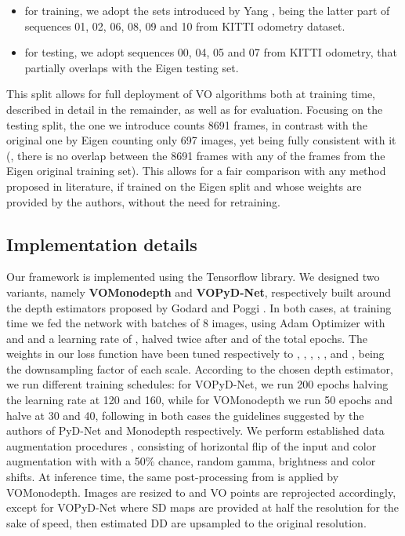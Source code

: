 \documentclass[10pt,twocolumn,letterpaper]{article}
\begin{document}
\begin{itemize}
    \item for training, we adopt the  sets introduced by Yang \etal \cite{yang2018deep}, being the latter part of sequences 01, 02, 06, 08, 09 and 10 from KITTI odometry dataset.
    
    \item for testing, we adopt sequences 00, 04, 05 and 07 from KITTI odometry, that partially overlaps with the Eigen testing set. 
\end{itemize}
This split allows for full deployment of VO algorithms both at training time, described in detail in the remainder, as well as for evaluation.
Focusing on the testing split, the one we introduce counts 8691 frames, in contrast with the original one by Eigen \etal \cite{Eigen} counting only 697 images, yet being fully consistent with it (\ie, there is no overlap between the 8691 frames with any of the frames from the Eigen original training set). This allows for a fair comparison with any method proposed in literature, if trained on the Eigen split and whose weights are provided by the authors, without the need for retraining.

\subsection{Implementation details}

Our framework is implemented using the Tensorflow library. 
We designed two variants, namely \textbf{VOMonodepth} and \textbf{VOPyD-Net}, respectively built around the depth estimators proposed by Godard \etal \cite{Godard1} and Poggi \etal \cite{pydnet18}. 
In both cases, at training time we fed the network with batches of 8 images, using Adam Optimizer \cite{adam} with  and  and a learning rate of , halved twice after  and  of the total epochs.  
The weights in our loss function have been tuned respectively to , , , , ,  and  , being  the downsampling factor of each scale.
According to the chosen depth estimator, we run different training schedules: for VOPyD-Net, we run 200 epochs halving the learning rate at 120 and 160, while for VOMonodepth we run 50 epochs and halve at 30 and 40, following in both cases the guidelines suggested by the authors of PyD-Net and Monodepth respectively. We perform established data augmentation procedures \cite{Godard1}, consisting of horizontal flip of the input and color augmentation with with a 50\% chance, random gamma, brightness and color shifts.
At inference time, the same post-processing from \cite{Godard1} is applied by VOMonodepth. Images are resized to  and VO points are reprojected accordingly, except for VOPyD-Net where SD maps are provided at half the resolution for the sake of speed, then estimated DD are upsampled to the original resolution.
\end{document}
